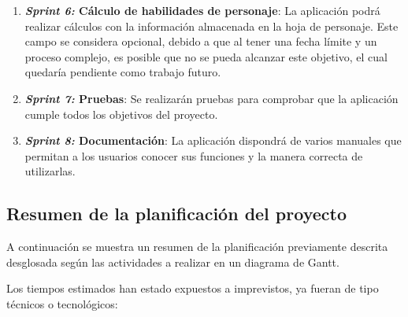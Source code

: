 \begin{enumerate}
    \item \textbf{\textit{Sprint 6:} Cálculo de habilidades de personaje}: La aplicación podrá realizar 
    cálculos con la información almacenada en la hoja de personaje. Este campo se considera opcional, debido a que 
    al tener una fecha límite y un proceso complejo, es posible que no se pueda alcanzar este objetivo, el cual quedaría 
    pendiente como trabajo futuro.

    \item \textbf{\textit{Sprint 7:} Pruebas}: Se realizarán pruebas para comprobar que la aplicación cumple todos los 
    objetivos del proyecto.

    \item \textbf{\textit{Sprint 8:} Documentación}: La aplicación dispondrá de varios manuales que permitan a los 
    usuarios conocer sus funciones y la manera correcta de utilizarlas.

\end{enumerate}

\subsection{Resumen de la planificación del proyecto}
A continuación se muestra un resumen de la planificación previamente descrita desglosada según 
las actividades a realizar en un diagrama de Gantt.\medskip       

Los tiempos estimados han estado expuestos a imprevistos, ya fueran de tipo técnicos o tecnológicos:

